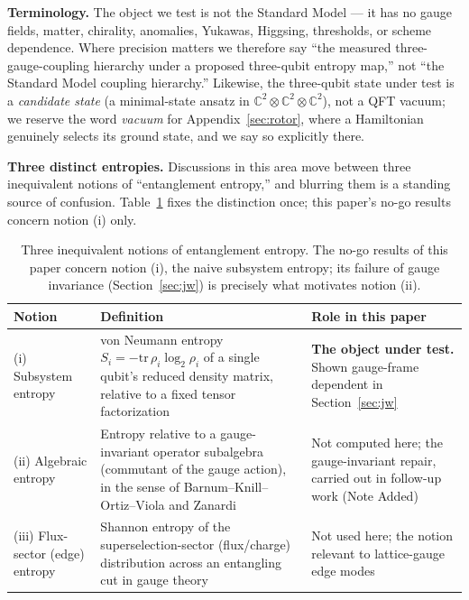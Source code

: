 \documentclass[11pt]{article}
\newcommand{\CC}{\mathbb{C}}
\begin{document}
\textbf{Terminology.} The object we test is not the Standard Model --- it has no gauge fields, matter, chirality, anomalies, Yukawas, Higgsing, thresholds, or scheme dependence. Where precision matters we therefore say ``the measured three-gauge-coupling hierarchy under a proposed three-qubit entropy map,'' not ``the Standard Model coupling hierarchy.'' Likewise, the three-qubit state under test is a \emph{candidate state} (a minimal-state ansatz in $\CC^2 \otimes \CC^2 \otimes \CC^2$), not a QFT vacuum; we reserve the word \emph{vacuum} for Appendix~\ref{sec:rotor}, where a Hamiltonian genuinely selects its ground state, and we say so explicitly there.

\textbf{Three distinct entropies.} Discussions in this area move between three inequivalent notions of ``entanglement entropy,'' and blurring them is a standing source of confusion. Table~\ref{tab:notions} fixes the distinction once; this paper's no-go results concern notion (i) only.

\begin{table}[ht]
\centering
\small
\begin{tabular}{p{3.4cm}p{5.6cm}p{4.6cm}}
\hline
\textbf{Notion} & \textbf{Definition} & \textbf{Role in this paper} \\
\hline
(i) Subsystem entropy & von Neumann entropy $S_i = -\mathrm{tr}\,\rho_i \log_2 \rho_i$ of a single qubit's reduced density matrix, relative to a fixed tensor factorization & \textbf{The object under test.} Shown gauge-frame dependent in Section~\ref{sec:jw} \\
(ii) Algebraic entropy & Entropy relative to a gauge-invariant operator subalgebra (commutant of the gauge action), in the sense of Barnum--Knill--Ortiz--Viola \cite{barnum} and Zanardi \cite{zanardi} & Not computed here; the gauge-invariant repair, carried out in follow-up work (Note Added) \\
(iii) Flux-sector (edge) entropy & Shannon entropy of the superselection-sector (flux/charge) distribution across an entangling cut in gauge theory & Not used here; the notion relevant to lattice-gauge edge modes \\
\hline
\end{tabular}
\caption{Three inequivalent notions of entanglement entropy. The no-go results of this paper concern notion (i), the naive subsystem entropy; its failure of gauge invariance (Section~\ref{sec:jw}) is precisely what motivates notion (ii).}
\label{tab:notions}
\end{table}
\end{document}
